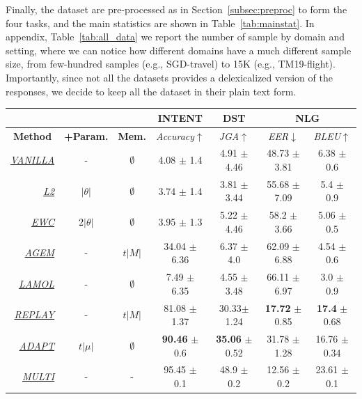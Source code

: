 \documentclass[11pt,a4paper]{article}
\begin{document}
Finally, the dataset are pre-processed as in Section~\ref{subsec:preproc} to form the four tasks, and the main statistics are shown in Table~\ref{tab:mainstat}. In appendix, Table~\ref{tab:all_data} we report the number of sample by domain and setting, where we can notice how different domains have a much different sample size, from few-hundred samples (e.g., SGD-travel) to 15K (e.g., TM19-flight). Importantly, since not all the datasets provides a delexicalized version of the responses, we decide to keep all the dataset in their plain text form.

\begin{table}[t]
\centering
\begin{tabular}{r|cc|c|c|cc}
\hline
                                     & \multicolumn{1}{l}{} & \multicolumn{1}{l|}{} & \textbf{INTENT}              & \textbf{DST}            & \multicolumn{2}{c}{\textbf{NLG}}                     \\ \hline
\multicolumn{1}{c|}{\textbf{Method}} & \textbf{+Param.}     & \textbf{Mem.}         & \textit{Accuracy}$\uparrow$ & \textit{JGA}$\uparrow$ & \textit{EER}$\downarrow$ & \textit{BLEU}$\uparrow$ \\ \hline
{\ul \textit{VANILLA}}               & -                    &$\emptyset$          &4.08  $\pm$ 1.4              &4.91 $\pm$ 4.46         &48.73 $\pm$ 3.81           &6.38 $\pm$ 0.6          \\
{\ul \textit{L2}}                    &$|\theta|$          &$\emptyset$            &3.74  $\pm$ 1.4              &3.81 $\pm$ 3.44         &55.68 $\pm$ 7.09            &5.4 $\pm$ 0.9           \\
{\ul \textit{EWC}}                   &$2|\theta|$        &$\emptyset$             &3.95  $\pm$ 1.3              &5.22 $\pm$ 4.46         &58.2  $\pm$ 3.66           &5.06 $\pm$ 0.5          \\
{\ul \textit{AGEM}}                  & -                    &$t|M|$               &34.04 $\pm$ 6.36             &6.37 $\pm$ 4.0         &62.09 $\pm$ 6.88            &4.54 $\pm$ 0.6          \\
{\ul \textit{LAMOL}}                 & -                    &$\emptyset$          &7.49   $\pm$ 6.35            &4.55 $\pm$ 3.48        &66.11 $\pm$ 6.97             &3.0 $\pm$ 0.9           \\
{\ul \textit{REPLAY}}                & -                    &$t|M|$               &81.08 $\pm$ 1.37             &30.33$\pm$ 1.24 &\textbf{17.72} $\pm$ 0.85         &\textbf{17.4} $\pm$ 0.68         \\
{\ul \textit{ADAPT}}    &$t|\mu|$            &$\emptyset$          &      \textbf{90.46} $\pm$ 0.6    &\textbf{35.06} $\pm$ 0.52       &31.78 $\pm$ 1.28            &16.76 $\pm$ 0.34         \\ \hline
{\ul \textit{MULTI}}                 & -                    & -                     &95.45 $\pm$ 0.1            &48.9 $\pm$ 0.2        &12.56 $\pm$ 0.2             &23.61 $\pm$ 0.1         \\ \hline
\end{tabular}



\end{table}
\end{document}
